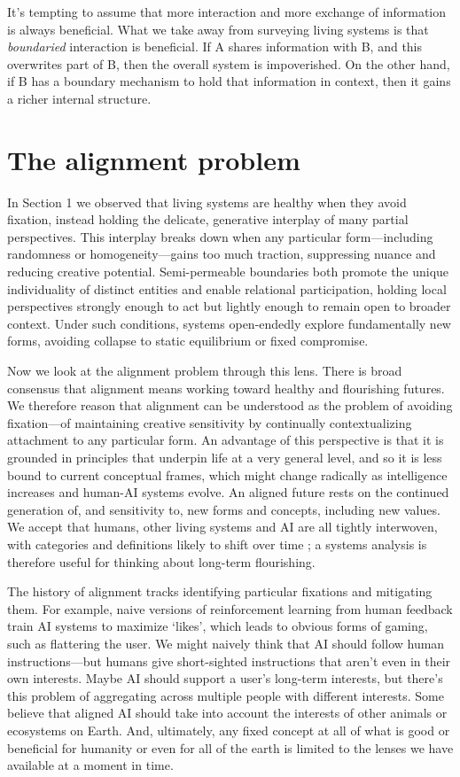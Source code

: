 \documentclass[11pt]{article}
\begin{document}
It's tempting to assume that more interaction and more exchange of information is always beneficial. What we take away from surveying living systems is that \textit{boundaried} interaction is beneficial. If A shares information with B, and this overwrites part of B, then the overall system is impoverished. On the other hand, if B has a boundary mechanism to hold that information in context, then it gains a richer internal structure. 


\section{The alignment problem}



In Section 1 we observed that living systems are healthy when they avoid fixation, instead holding the delicate, generative interplay of many partial perspectives. This interplay breaks down when any particular form---including randomness or homogeneity---gains too much traction, suppressing nuance and reducing creative potential. Semi-permeable boundaries both promote the unique individuality of distinct entities and enable relational participation, holding local perspectives strongly enough to act but lightly enough to remain open to broader context. Under such conditions, systems open-endedly explore fundamentally new forms, avoiding collapse to static equilibrium or fixed compromise.


Now we look at the alignment problem through this lens. There is broad consensus that alignment means working toward healthy and flourishing futures. We therefore reason that alignment can be understood as the problem of avoiding fixation---of maintaining creative sensitivity by continually contextualizing attachment to any particular form. An advantage of this perspective is that it is grounded in principles that underpin life at a very general level, and so it is less bound to current conceptual frames, which might change radically as intelligence increases and human-AI systems evolve. An aligned future rests on the continued generation of, and sensitivity to, new forms and concepts, including new values. We accept that humans, other living systems and AI are all tightly interwoven, with categories and definitions likely to shift over time \citep{latour2012we, bateson1972steps}; a systems analysis is therefore useful for thinking about long-term flourishing.


The history of alignment tracks identifying particular fixations and mitigating them. For example, naive versions of reinforcement learning from human feedback train AI systems to maximize `likes', which leads to obvious forms of gaming, such as flattering the user. We might naively think that AI should follow human instructions---but humans give short-sighted instructions that aren't even in their own interests. Maybe AI should support a user's long-term interests, but there's this problem of aggregating across multiple people with different interests. Some believe that aligned AI should take into account the interests of other animals or ecosystems on Earth. And, ultimately, any fixed concept at all of what is good or beneficial for humanity or even for all of the earth is limited to the lenses we have available at a moment in time.
\end{document}
